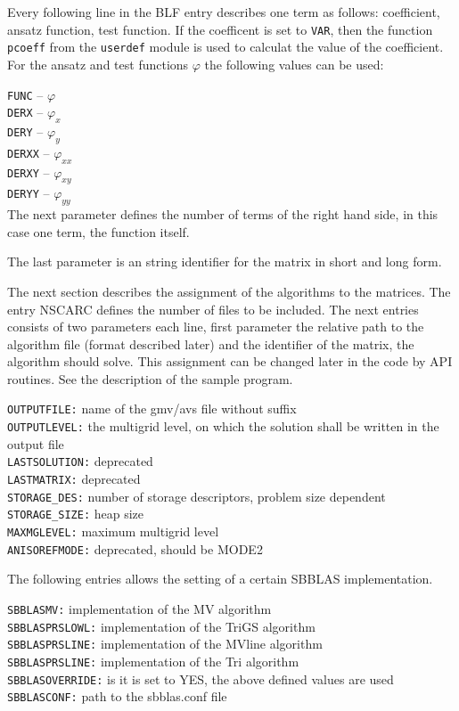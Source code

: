 Every following line in the BLF entry describes one term as follows: coefficient,
ansatz function, test function. If the coefficent is set to \verb+VAR+, then the
function \verb+pcoeff+ from the \verb+userdef+ module is used to calculat the
value of the coefficient. For the ansatz and test functions $\varphi$ the following values
can be used:

\verb+FUNC+  -- $\varphi$\\
\verb+DERX+  -- $\varphi_x$\\
\verb+DERY+  -- $\varphi_y$\\
\verb+DERXX+ -- $\varphi_{xx}$\\
\verb+DERXY+ -- $\varphi_{xy}$\\
\verb+DERYY+ -- $\varphi_{yy}$\\

The next parameter defines the number of terms of the right hand side, in
this case one term, the function itself. 

The last parameter is an string identifier for the matrix in short and long
form.

The next section describes the assignment of the \scarc{} algorithms to the
matrices. The entry  NSCARC defines the number of \scarc{} files to be
included. The next entries consists of two parameters each line, first
parameter the relative path to the \scarc{} algorithm file (format described
later) and the identifier of the matrix, the algorithm should solve. This
assignment can be changed later in the code by API routines. See the
description of the sample program.

\verb+OUTPUTFILE:+    name of the gmv/avs file without suffix\\
\verb+OUTPUTLEVEL:+   the multigrid level, on which the solution shall be
                      written in the output file\\
\verb+LASTSOLUTION:+  deprecated\\
\verb+LASTMATRIX:+    deprecated\\
\verb+STORAGE_DES:+   number of storage descriptors, problem size dependent
\verb+STORAGE_SIZE:+  heap size\\
\verb+MAXMGLEVEL:+    maximum multigrid level\\
\verb+ANISOREFMODE:+  deprecated, should be MODE2

The following entries allows the setting of a certain SBBLAS implementation.

\verb+SBBLASMV:+  implementation of the MV algorithm\\
\verb+SBBLASPRSLOWL:+  implementation of the TriGS algorithm\\
\verb+SBBLASPRSLINE:+  implementation of the MVline algorithm\\
\verb+SBBLASPRSLINE:+  implementation of the Tri algorithm\\
\verb+SBBLASOVERRIDE:+  is it is set to YES, the above defined values are used\\
\verb+SBBLASCONF:+  path to the sbblas.conf file



